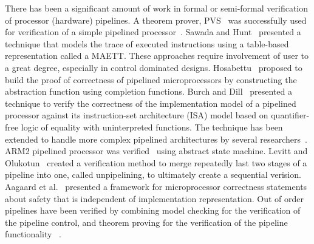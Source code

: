 There has been a significant amount of work in formal or semi-formal verification of processor (hardware) pipelines. 
A theorem prover, PVS~\cite{pvs} 
was successfully used for verification of a simple pipelined processor~\cite{Cyrluk94}. Sawada and Hunt~\cite{sh:pipeline} 
presented a technique that models the trace of executed 
instructions using a table-based representation called a MAETT. These approaches require involvement 
of user to a great degree, especially in control dominated designs. Hosabettu~\cite{Hosabettu2000} proposed to build the proof of correctness 
of pipelined microprocessors by constructing the abstraction function 
using completion functions. Burch and Dill~\cite{bd:pipeline} presented a technique to verify the 
correctness of the implementation model of a pipelined processor 
against its instruction-set architecture (ISA) model based on 
quantifier-free logic of equality with uninterpreted functions. 
The technique has been extended to handle more complex pipelined
architectures by several researchers~\cite{Skakkebæk1998,Velev2000,VelevBryant2000, pm:pipelines, velev05,sud-2010}. 
ARM2 pipelined processor was verified~\cite{Huggins1998} using abstract state machine. Levitt and Olukotun~\cite{levitt1997} created a verification method to merge repeatedly last two stages of a pipeline into one, called unpipelining, to ultimately create a sequential verision. 
Aagaard et al.~\cite{Aagaard2001} presented a framework
for microprocessor correctness statements about safety that is independent
of implementation representation. Out of order pipelines have been verified by combining model checking for the verification 
of the pipeline control, and theorem proving for the verification of the pipeline functionality~\cite{Jacobi2002} . 

